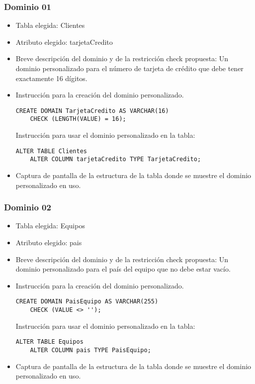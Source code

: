 \subsubsection*{Dominio 01}
\begin{itemize}
    \item Tabla elegida: Clientes
    \item Atributo elegido: tarjetaCredito
    \item Breve descripción del dominio y de la restricción check propuesta: Un dominio personalizado para el número de tarjeta de crédito que debe tener exactamente 16 dígitos.
    \item Instrucción para la creación del dominio personalizado.
    \begin{lstlisting}[caption={Tablas para la BdDatos}, label={lst:sql_estadios}]
    CREATE DOMAIN TarjetaCredito AS VARCHAR(16)
    CHECK (LENGTH(VALUE) = 16);
    \end{lstlisting}
    Instrucción para usar el dominio personalizado en la tabla:
    \begin{lstlisting}[caption={Tablas para la BdDatos}, label={lst:sql_estadios}]
    ALTER TABLE Clientes
    ALTER COLUMN tarjetaCredito TYPE TarjetaCredito;        
    \end{lstlisting}
    \item Captura de pantalla de la estructura de la tabla donde se muestre el dominio personalizado
    en uso.
\end{itemize}


\subsubsection*{Dominio 02}
\begin{itemize}
    \item Tabla elegida: Equipos
    \item Atributo elegido: pais
    \item Breve descripción del dominio y de la restricción check propuesta: Un dominio personalizado para el país del equipo que no debe estar vacío.
    \item Instrucción para la creación del dominio personalizado.
    \begin{lstlisting}[caption={Tablas para la BdDatos}, label={lst:sql_estadios}]
    CREATE DOMAIN PaisEquipo AS VARCHAR(255)
    CHECK (VALUE <> '');        
    \end{lstlisting}
    Instrucción para usar el dominio personalizado en la tabla:
    \begin{lstlisting}[caption={Tablas para la BdDatos}, label={lst:sql_estadios}]
    ALTER TABLE Equipos
    ALTER COLUMN pais TYPE PaisEquipo;        
    \end{lstlisting}
    \item Captura de pantalla de la estructura de la tabla donde se muestre el dominio personalizado
    en uso.
\end{itemize}


